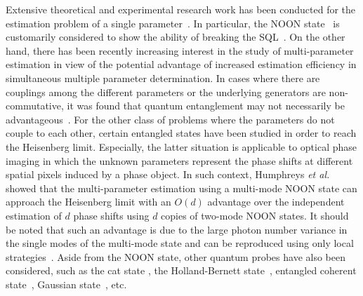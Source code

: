 \documentclass[aps,pra,reprint,showpacs,groupedaddress]{revtex4-1}
\begin{document}
Extensive theoretical and experimental research work has been conducted for the estimation problem of a single parameter~\cite{Bollinger1996_single_NOON, gerry2001_single_ECS, Kok2004_single_NOON_l,Giovannetti2006_entanglement_eigenstates_single, Dorner2009_single_NOON_noise, Rivas2010_single_CS_lnl, Joo2011_singe_ECS_l, krischek2011_experiments_single, Datta2011_single_HBstate, Joo2012_singe_ECS_nl, Tan2014_single_MZI_squeezeThermal_evenOdd, Lee2015_single_multiheadcat_l, Liu2016_multi_GeneralizedECS_lnl, Knott2016_single_squeezed}. In particular, the NOON state~\cite{Boto-etal2000, Lee2002_single_NOON_name} is customarily considered to show the ability of breaking the SQL~\cite{Bollinger1996_single_NOON, Kok2004_single_NOON_l, Dorner2009_single_NOON_noise}.  On the other hand, there has been recently increasing interest in the study of multi-parameter estimation in view of the potential advantage of increased estimation efficiency in simultaneous multiple parameter determination.  In cases where there are couplings among the different parameters or the underlying generators are non-commutative, it was found that quantum entanglement may not necessarily be advantageous~\cite{Kok-etal2015,Baumgratz-Datta2016}.
For the other class of problems where the parameters do not couple to each other, certain entangled states have been studied in order to reach the Heisenberg limit.
Especially, the latter situation is applicable to optical phase imaging in which the unknown parameters represent the phase shifts at different spatial pixels induced by a phase object.  In such context, Humphreys \textit{et al.}~\cite{Humphreys2013_multi_NOON_l} showed that the multi-parameter estimation using a multi-mode NOON state can approach the Heisenberg limit with an $O(d)$ advantage over the independent estimation of $d$ phase shifts using $d$ copies of two-mode NOON states. It should be noted that such an advantage is due to the large photon number variance in the single modes of the multi-mode state and can be reproduced using only local strategies~\cite{Knott2016_modeseparablestate}.
Aside from the NOON state, other quantum probes have also been considered, such as the cat state \cite{Lee2015_single_multiheadcat_l}, the Holland-Bernett state~\cite{Datta2011_single_HBstate}, entangled coherent state~\cite{Ono2010_multi_ECS_loss, Joo2011_singe_ECS_l, Joo2012_singe_ECS_nl, Cheng2014_2_NOON_ECS_lnl_simultaneous, Liu2013_multi_ECS_loss, Liu2016_multi_GeneralizedECS_lnl, Zhang2013_multi_ECS_loss, Jing2014_multi_ECS_loss}, Gaussian state~\cite{Pinel2013_multi_Gaussian, Safranek2015_multi_gaussian}, etc.
\end{document}
